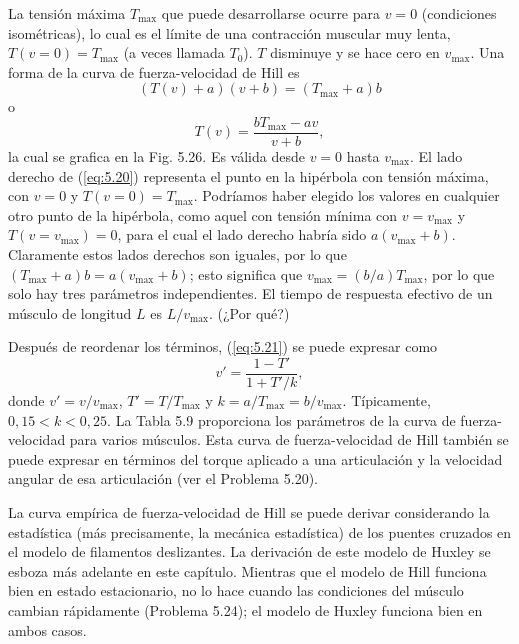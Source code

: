 \documentclass[12pt]{book}
\begin{document}
La tensión máxima $T_{\text{max}}$ que puede desarrollarse ocurre para $v = 0$ (condiciones isométricas), lo cual es el límite de una contracción muscular muy lenta, $T(v = 0) = T_{\text{max}}$ (a veces llamada $T_0$). $T$ disminuye y se hace cero en $v_{\text{max}}$. Una forma de la curva de fuerza-velocidad de Hill es
\begin{equation}
(T(v) + a)(v + b) = (T_{\text{max}} + a)b
\label{eq:5.20}
\end{equation}
o
\begin{equation}
T(v) = \frac{b T_{\text{max}} - a v}{v + b},
\label{eq:5.21}
\end{equation}
la cual se grafica en la Fig. 5.26. Es válida desde $v = 0$ hasta $v_{\text{max}}$. El lado derecho de (\ref{eq:5.20}) representa el punto en la hipérbola con tensión máxima, con $v = 0$ y $T(v = 0) = T_{\text{max}}$. Podríamos haber elegido los valores en cualquier otro punto de la hipérbola, como aquel con tensión mínima con $v = v_{\text{max}}$ y $T(v = v_{\text{max}}) = 0$, para el cual el lado derecho habría sido $a(v_{\text{max}} + b)$. Claramente estos lados derechos son iguales, por lo que $(T_{\text{max}} + a)b = a(v_{\text{max}} + b)$; esto significa que $v_{\text{max}} = (b/a)T_{\text{max}}$, por lo que solo hay tres parámetros independientes. El tiempo de respuesta efectivo de un músculo de longitud $L$ es $L/v_{\text{max}}$. (¿Por qué?)

Después de reordenar los términos, (\ref{eq:5.21}) se puede expresar como
\begin{equation}
v' = \frac{1 - T'}{1 + T'/k},
\label{eq:5.22}
\end{equation}
donde $v' = v/v_{\text{max}}$, $T' = T/T_{\text{max}}$ y $k = a/T_{\text{max}} = b/v_{\text{max}}$. Típicamente, $0{,}15 < k < 0{,}25$. La Tabla 5.9 proporciona los parámetros de la curva de fuerza-velocidad para varios músculos. Esta curva de fuerza-velocidad de Hill también se puede expresar en términos del torque aplicado a una articulación y la velocidad angular de esa articulación (ver el Problema 5.20).

La curva empírica de fuerza-velocidad de Hill se puede derivar considerando la estadística (más precisamente, la mecánica estadística) de los puentes cruzados en el modelo de filamentos deslizantes. La derivación de este modelo de Huxley se esboza más adelante en este capítulo. Mientras que el modelo de Hill funciona bien en estado estacionario, no lo hace cuando las condiciones del músculo cambian rápidamente (Problema 5.24); el modelo de Huxley funciona bien en ambos casos.
\end{document}
